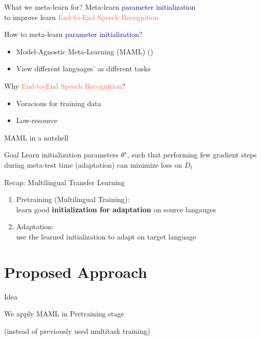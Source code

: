 \documentclass{beamer}
\begin{document}
\begin{frame}[t]{What we meta-learn for?}
  \centering Meta-learn \textcolor{navy}{parameter initialization} \\ to improve learn \textcolor{tomato}{End-to-End Speech Recognition}

  \pause
  \flushleft How to meta-learn \textcolor{navy}{parameter initialization}?
  \begin{itemize}
    \item Model-Agnostic Meta-Learning (MAML) (\citealt{finn2017model})
    \item View different languages' as different tasks
  \end{itemize}

  \pause

  Why \textcolor{tomato}{End-to-End Speech Recognition}?
  \begin{itemize}
    \item Voracious for training data
    \item Low-resource 
  \end{itemize}
\end{frame}

\begin{frame}[t]{MAML in a nutshell}
  \begin{block}{Goal}
    Learn initialization parameters $\theta^\star$, such that performing few gradient steps during meta-test time (adaptation) can minimize loss on $D_t$
  \end{block}
  \flushright \hyperlink{overview of maml}{}
\end{frame}

\begin{frame}[t]{Recap: Multilingual Transfer Learning}

  \begin{enumerate}
    \item Pretraining (Multilingual Training): \\ learn good \textbf{initialization for adaptation} on source langauges
    \item Adaptation: \\ use the learned initialization to adapt on target language
  \end{enumerate}
\end{frame}

\section{Proposed Approach}
\begin{frame}[t]{Idea}
	\begin{center}
    \LARGE{We apply MAML in Pretraining stage}
	\end{center}

  \vspace{3em}
  (instead of previously used multitask training)
\end{frame}
\end{document}
